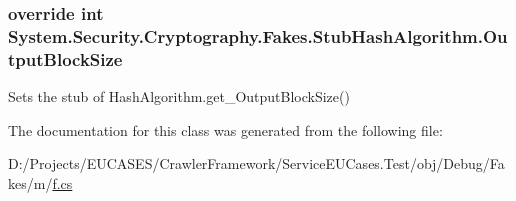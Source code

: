 \hypertarget{class_system_1_1_security_1_1_cryptography_1_1_fakes_1_1_stub_hash_algorithm_a29a5453081b7ff8124b0153450989612}{
\subsubsection[{Output\-Block\-Size}]{\setlength{\rightskip}{0pt plus 5cm}override int System.\-Security.\-Cryptography.\-Fakes.\-Stub\-Hash\-Algorithm.\-Output\-Block\-Size\hspace{0.3cm}{\ttfamily [get]}}}\label{class_system_1_1_security_1_1_cryptography_1_1_fakes_1_1_stub_hash_algorithm_a29a5453081b7ff8124b0153450989612}


Sets the stub of Hash\-Algorithm.\-get\-\_\-\-Output\-Block\-Size()



The documentation for this class was generated from the following file\-:\begin{DoxyCompactItemize}
\item 
D\-:/\-Projects/\-E\-U\-C\-A\-S\-E\-S/\-Crawler\-Framework/\-Service\-E\-U\-Cases.\-Test/obj/\-Debug/\-Fakes/m/\hyperlink{m_2f_8cs}{f.\-cs}\end{DoxyCompactItemize}
